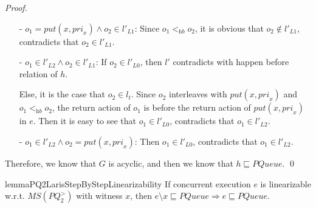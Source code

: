 \begin {proof}
\begin{itemize}
\item[-] $o_1 = \textit{put}(x,\textit{pri}_x) \wedge o_2 \in l'_{L1}$: Since $o_1 <_{\textit{hb}} o_2$, it is obvious that $o_2 \notin l'_{L1}$, contradicts that $o_2 \in l'_{L1}$.

\item[-] $o_1 \in l'_{L2} \wedge o_2 \in l'_{L1}$: If $o_2 \in l'_{L0}$, then $l'$ contradicts with happen before relation of $h$.

    Else, it is the case that $o_2 \in l_t$. Since $o_2$ interleaves with $\textit{put}(x,\textit{pri}_x)$ and $o_1 <_{\textit{hb}} o_2$, the return action of $o_1$ is before the return action of $\textit{put}(x,\textit{pri}_x)$ in $e$. Then it is easy to see that $o_1 \in l'_{L0}$, contradicts that $o_1 \in l'_{L2}$.

\item[-] $o_1 \in l'_{L2} \wedge o_2 = \textit{put}(x,\textit{pri}_x)$: Then $o_1 \in l'_{L0}$, contradicts that $o_1 \in l'_{L2}$.
\end{itemize}

Therefore, we know that $G$ is acyclic, and then we know that $h \sqsubseteq \textit{PQueue}$. \qed
\end {proof}



\begin{restatable}{lemma}{PQ2LarisStepByStepLinearizability}
\label{lemma:PQ2Lar is step-by-step linearizability}
If concurrent execution $e$ is linearizable w.r.t. $\textit{MS}(\textit{PQ}_2^{>})$ with witness $x$, then $e \setminus x \sqsubseteq \textit{PQueue} \Rightarrow e \sqsubseteq \textit{PQueue}$.
\end{restatable}


